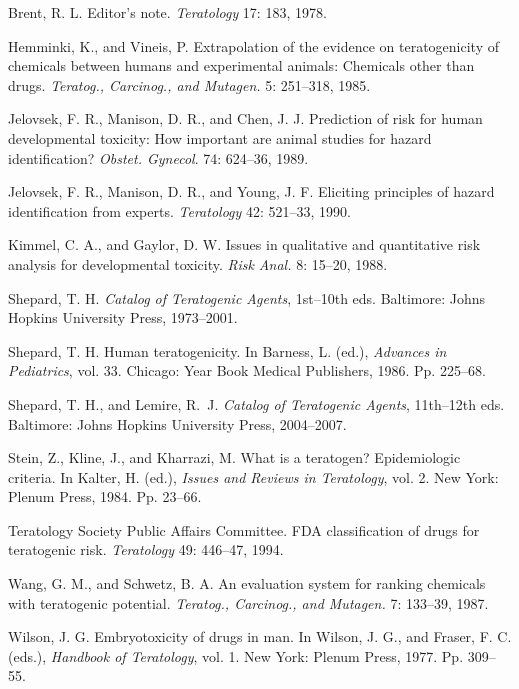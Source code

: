 \begin{references}

\item Brent, R. L. Editor's note. {\it Teratology} 17: 183, 1978.
\item Hemminki, K., and Vineis, P. Extrapolation of the evidence on
teratogenicity of chemicals between
humans and experimental animals: Chemicals other than drugs.
{\it Teratog., Carcinog., and Mutagen.} 5: 251--318, 1985.
\item Jelovsek, F. R., Manison, D. R., and Chen, J. J. 
Prediction of risk for human developmental toxicity:
How important are animal studies for hazard identification?
{\it Obstet. Gynecol}. 74: 624--36, 1989.
\item Jelovsek, F. R., Manison, D. R., and Young, J. F.
Eliciting principles of hazard identification from
experts. {\it Teratology} 42: 521--33, 1990.
\item Kimmel, C. A., and Gaylor, D. W.
Issues in qualitative and quantitative risk analysis for developmental toxicity.
{\it Risk Anal.} 8: 15--20, 1988.
\item Shepard, T. H. {\it Catalog of Teratogenic Agents}, 1st--10th eds.
Baltimore: Johns Hopkins University
Press, 1973--2001.
\item Shepard, T. H. Human teratogenicity. In Barness, L. (ed.),
{\it Advances in Pediatrics}, vol. 33. Chicago:
Year Book Medical Publishers, 1986. Pp. 225--68.
\item Shepard, T. H., and Lemire, R.~J.  {\it Catalog of Teratogenic Agents}, 11th--12th eds. 
Baltimore: Johns Hopkins University Press, 2004--2007.
\item Stein, Z., Kline, J., and Kharrazi, M. What is a teratogen?
Epidemiologic criteria. In Kalter, H. (ed.),
{\it Issues and Reviews in Teratology}, vol. 2. New York:
Plenum Press, 1984. Pp. 23--66.
\item Teratology  Society Public Affairs Committee.
FDA classification of drugs for teratogenic risk.
{\it Teratology} 49: 446--47, 1994.
\item Wang, G. M., and Schwetz, B. A. An evaluation system for ranking
chemicals with teratogenic potential. {\it Teratog.,
Carcinog., and Mutagen.} 7: 133--39, 1987.
\item Wilson, J. G. Embryotoxicity of drugs in man. In Wilson, J. G.,
and Fraser, F. C. (eds.), {\it Handbook of
Teratology}, vol. 1. New York: Plenum Press, 1977. Pp. 309--55.
\end{references}



